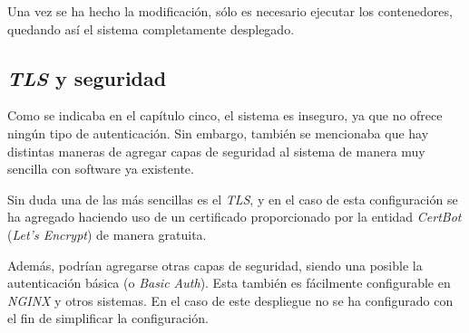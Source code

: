Una vez se ha hecho la modificación, sólo es necesario ejecutar los contenedores, quedando así el sistema completamente desplegado.

\subsection{\textit{TLS} y seguridad}

Como se indicaba en el capítulo cinco, el sistema es inseguro, ya que no ofrece ningún tipo de autenticación. Sin embargo, también se mencionaba que hay distintas maneras de agregar capas de seguridad al sistema de manera muy sencilla con software ya existente.

Sin duda una de las más sencillas es el \textit{TLS}, y en el caso de esta configuración se ha agregado haciendo uso de un certificado proporcionado por la entidad \textit{CertBot} (\textit{Let's Encrypt}) de manera gratuita.

Además, podrían agregarse otras capas de seguridad, siendo una posible la autenticación básica (o \textit{Basic Auth}). Esta también es fácilmente configurable en \textit{NGINX} y otros sistemas. En el caso de este despliegue no se ha configurado con el fin de simplificar la configuración.

